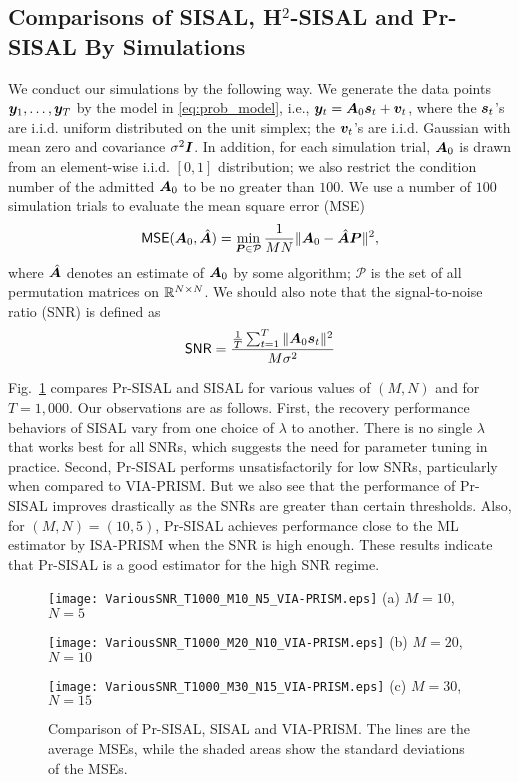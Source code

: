 \documentclass[10pt,twocolumn,twoside]{IEEEtran}
\begin{document}
\subsection{Comparisons of SISAL, H$^2$-SISAL and Pr-SISAL By Simulations}
\label{sect:syth_sim}

We conduct our simulations by the following way.
We generate the data points ${\bm y}_1,\ldots,{\bm y}_T$ by the model in \eqref{eq:prob_model}, i.e., ${\bm y}_t = {\bm A}_0 {\bm s}_t + {\bm v}_t$, where the ${\bm s}_t$'s are i.i.d. uniform distributed on the unit simplex; the ${\bm v}_t$'s are i.i.d. Gaussian with mean zero and covariance $\sigma^2 {\bm I}$.
In addition, for each simulation trial, ${\bm A}_0$ is drawn from an element-wise i.i.d. $[0,1]$ distribution;
we also restrict the condition number of the admitted ${\bm A}_0$ to be no greater than $100$.
We use a number of $100$ simulation trials to evaluate the mean square error (MSE)
\[
{\sf MSE}({\bm A}_0,\hat{{\bm A}}) = \min_{\bm P \in \mathcal{P} } \frac{1}{MN} \| {\bm A}_0 - \hat{{\bm A}} {\bm P} \|^2,
\]
where $\hat{{\bm A}}$ denotes an estimate of ${\bm A}_0$ by some algorithm; $\mathcal{P}$ is the set of all permutation matrices on $\mathbb{R}^{N \times N}$.
We should also note that the signal-to-noise ratio (SNR) is defined as
\[
{\sf SNR} = \frac{\frac{1}{T} \sum_{t=1}^T \| {\bm A}_0 {\bm s}_t \|^2 }{ M \sigma^2 }
\]

Fig.~\ref{fig:PrSISAL} compares Pr-SISAL and SISAL for various values of $(M,N)$ and for $T=1,000$.
Our observations are as follows.
First, the recovery performance behaviors of SISAL vary from one choice of $\lambda$ to another.
There is no single $\lambda$ that works best for all SNRs, which suggests the need for parameter tuning in practice.
Second, Pr-SISAL performs unsatisfactorily for low SNRs, particularly when compared to VIA-PRISM. But we also see that the performance of Pr-SISAL improves drastically as the SNRs are greater than certain thresholds.
Also, for $(M,N)= (10,5)$, Pr-SISAL achieves performance close to the ML estimator by ISA-PRISM when the SNR is high enough.
These results indicate that Pr-SISAL is a good estimator for the high SNR regime.


\begin{figure}[p]
	\centering
	\begin{minipage}[b]{.75\textwidth}
		\centering
		\texttt{[image: VariousSNR\_T1000\_M10\_N5\_VIA-PRISM.eps]}
		(a) $M = 10$, $N = 5$
	\end{minipage}
	\begin{minipage}[b]{.75\textwidth}
		\centering
		\texttt{[image: VariousSNR\_T1000\_M20\_N10\_VIA-PRISM.eps]}
		(b) $M = 20$, $N = 10$
	\end{minipage}
	\begin{minipage}[b]{.75\textwidth}
		\centering
		\texttt{[image: VariousSNR\_T1000\_M30\_N15\_VIA-PRISM.eps]}
		(c) $M = 30$, $N = 15$
	\end{minipage}
	\caption{Comparison of Pr-SISAL, SISAL and VIA-PRISM. The lines are the average MSEs, while the shaded areas show the standard deviations of the MSEs.}
	\label{fig:PrSISAL}	
\end{figure}
\end{document}
